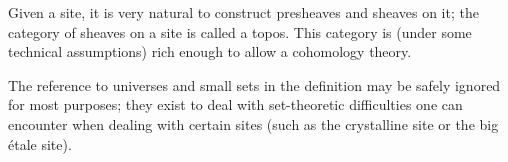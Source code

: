 \documentclass[12pt]{article}
\begin{document}
Given a site, it is very natural to construct presheaves and sheaves on it; the category of sheaves on a site is called a topos.  This category is (under some technical assumptions) rich enough to allow a cohomology theory.

The reference to universes and small sets in the definition may be safely ignored for most purposes; they exist to deal with set-theoretic difficulties one can encounter when dealing with certain sites (such as the crystalline site or the big \'etale site).

\begin{thebibliography}{9}


\end{thebibliography}
\end{document}
